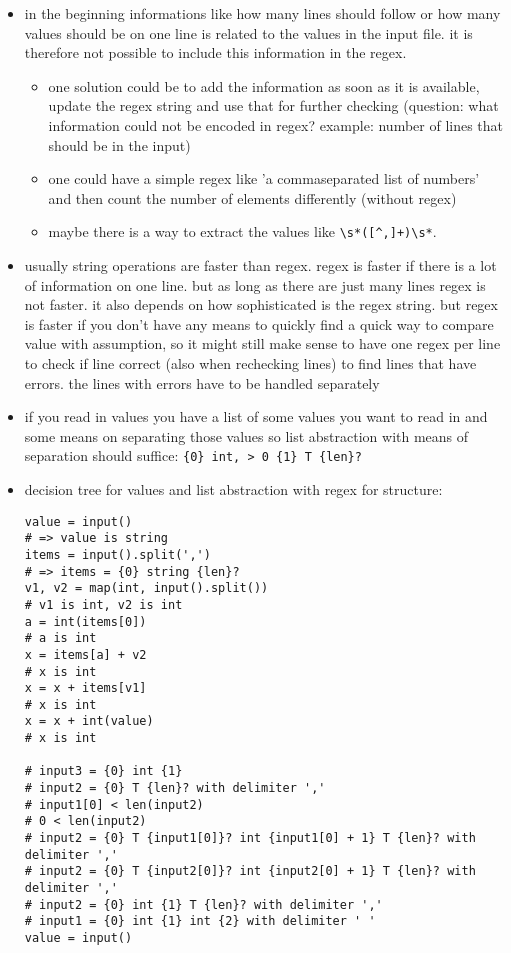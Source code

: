 \documentclass[11pt]{article}
\begin{document}
\begin{itemize}
\item in the beginning informations like how many lines should follow or how many values should be on one line is related to the values in the input file. it is therefore not possible to include this information in the regex.
\begin{itemize}
\item one solution could be to add the information as soon as it is available, update the regex string and use that for further checking (question: what information could not be encoded in regex? example: number of lines that should be in the input)
\item one could have a simple regex like 'a commaseparated list of numbers' and then count the number of elements differently (without regex)
\item maybe there is a way to extract the values like \verb|\s*([^,]+)\s*|. 
\end{itemize}

\item usually string operations are faster than regex. regex is faster if there is a lot of information on one line. but as long as there are just many lines regex is not faster. it also depends on how sophisticated is the regex string. but regex is faster if you don't have any means to quickly find a quick way to compare value with assumption, so it might still make sense to have one regex per line to check if line correct (also when rechecking lines) to find lines that have errors. the lines with errors have to be handled separately

\item if you read in values you have a list of some values you want to read in and some means on separating those values so list abstraction with means of separation should suffice: \verb|{0} int, > 0 {1} T {len}?|

\item decision tree for values and list abstraction with regex for structure:

\begin{lstlisting}[numbers=none]
value = input()
# => value is string
items = input().split(',')
# => items = {0} string {len}?
v1, v2 = map(int, input().split())
# v1 is int, v2 is int
a = int(items[0])
# a is int
x = items[a] + v2
# x is int
x = x + items[v1]
# x is int
x = x + int(value)
# x is int

# input3 = {0} int {1}
# input2 = {0} T {len}? with delimiter ','
# input1[0] < len(input2)
# 0 < len(input2)
# input2 = {0} T {input1[0]}? int {input1[0] + 1} T {len}? with delimiter ','
# input2 = {0} T {input2[0]}? int {input2[0] + 1} T {len}? with delimiter ','
# input2 = {0} int {1} T {len}? with delimiter ','
# input1 = {0} int {1} int {2} with delimiter ' '
value = input()


\end{lstlisting}
\end{itemize}
\end{document}
